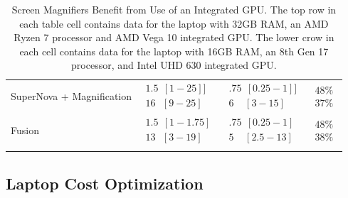 \begin{longtable}[]{
		>{\raggedright\arraybackslash}m{}
		>{\raggedright\arraybackslash}m{}
		>{\raggedright\arraybackslash}m{}
		>{\raggedright\arraybackslash}m{}
		}
		SuperNova + Magnification & $\begin{array}{l}1.5~~[1-25] ]     \\16~~~[9-25]\end{array}$ & $\begin{array}{l}.75~~[0.25-1] ] \\6~~~~~[3-15]\end{array}$ & $\begin{array}{l} 48\% \\ 37\%\end{array}$ \\ \cdashline{2-4}
		Fusion                    & $\begin{array}{l}1.5~~[1-1.75]     \\13~~~[3-19]\end{array}$ & $\begin{array}{l}.75~~[0.25-1] \\5~~~~~[2.5-13]\end{array}$ & $\begin{array}{l} 48\% \\ 38\%\end{array}$ \\[1.0em]\hline
		\caption[Screen Magnifiers Benefit from Integrated GPU]{Screen Magnifiers Benefit from Use of an Integrated GPU. The top row in each table cell contains data for the laptop with 32GB RAM, an AMD Ryzen 7 processor and AMD Vega 10 integrated GPU. The lower crow in each cell contains data for the laptop with 16GB RAM, an 8th Gen 17 processor, and Intel UHD 630 integrated GPU.} \label{tab:table51}
	\end{longtable}\clearpage
	
	\pagebreak	\hypertarget{optimizing-cost-with-performance}{}\subsection{Laptop Cost Optimization}\label{optimizing-cost-with-performance}
	
